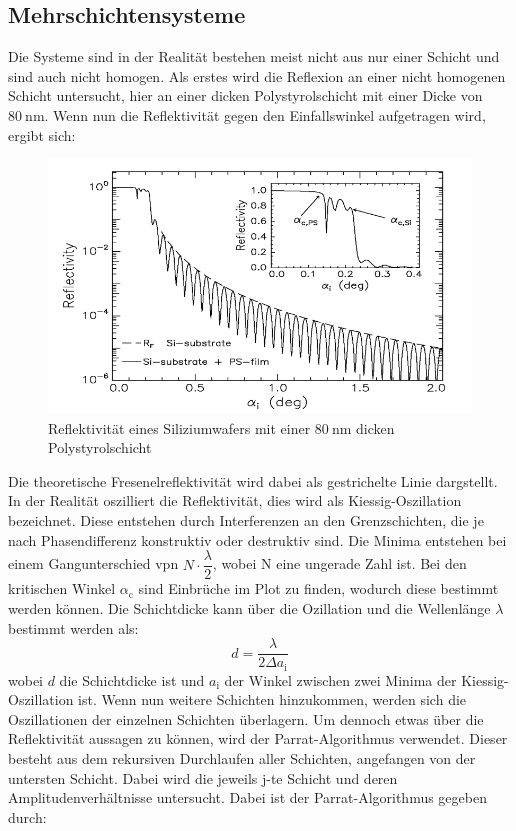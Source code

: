 \subsection{Mehrschichtensysteme}
\label{sec:Mehrschichtensysteme}
Die Systeme  sind in der Realität bestehen meist nicht aus nur einer Schicht und sind auch nicht homogen. Als erstes wird die Reflexion an einer nicht homogenen Schicht untersucht, hier an einer  dicken Polystyrolschicht mit einer Dicke von $\SI{80}{\nano\meter}$. Wenn nun die Reflektivität gegen den Einfallswinkel aufgetragen wird, ergibt sich:
\begin{figure}[h!]
  \label{fig:kiessig}
  \centering
  \includegraphics[scale=0.4]{fig/kiessing.png}
  \caption{Reflektivität eines Siliziumwafers mit einer $\SI{80}{\nano\meter}$ dicken Polystyrolschicht \cite[8]{Anleitung3}}
\end{figure}
\FloatBarrier
\noindent Die theoretische Fresenelreflektivität wird dabei als gestrichelte Linie dargstellt. In der Realität oszilliert die Reflektivität, dies wird als Kiessig-Oszillation bezeichnet. Diese entstehen durch Interferenzen an den Grenzschichten, die je nach Phasendifferenz konstruktiv oder destruktiv sind. Die Minima entstehen bei einem Gangunterschied vpn $N\cdot\dfrac{\lambda}{2}$, wobei N eine ungerade Zahl ist. Bei den kritischen Winkel $\alpha_\mathrm{c}$ sind Einbrüche im Plot zu finden, wodurch diese bestimmt werden können. Die Schichtdicke kann über die Ozillation und die Wellenlänge $\lambda$ bestimmt werden als:
\begin{equation}
  \label{eqn:Schichtdicke}
d = \dfrac{\lambda}{2\Delta a_\mathrm{i}}
\end{equation}
wobei $d$ die Schichtdicke ist und  $a_\mathrm{i}$ der Winkel zwischen zwei Minima der Kiessig-Oszillation ist.
Wenn nun weitere Schichten hinzukommen, werden sich die Oszillationen der einzelnen Schichten überlagern. Um dennoch etwas über die Reflektivität aussagen zu können, wird der Parrat-Algorithmus verwendet. Dieser besteht aus dem rekursiven Durchlaufen aller Schichten, angefangen von der untersten Schicht. Dabei wird die jeweils j-te Schicht und deren Amplitudenverhältnisse untersucht. Dabei ist der Parrat-Algorithmus gegeben durch:
